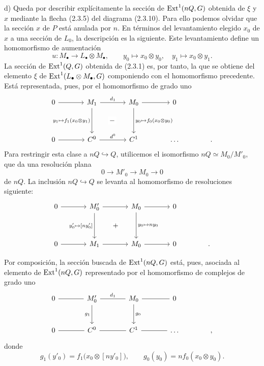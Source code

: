 \medskip
\noindent d) Queda por describir explícitamente la sección de
$\operatorname{Ext}^1(nQ,G)$ obtenida de $\xi$ y $x$ mediante la flecha (2.3.5)
del diagrama (2.3.10). Para ello podemos olvidar que la sección $x$ de
$P$ está anulada por $n$. En términos del levantamiento elegido $x_0$
de $x$ a una sección de $L_0$, la descripción es la siguiente. Este
levantamiento define un homomorfismo de aumentación
\[
 u:M_\bullet\longrightarrow L_\bullet\otimes M_\bullet,
 \qquad
 y_0\longmapsto x_0\otimes y_0,
 \quad
 y_1\longmapsto x_0\otimes y_1.
\]
La sección de $\operatorname{Ext}^1(Q,G)$ obtenida de (2.3.1) es, por tanto, la que
se obtiene del elemento $\xi$ de
$\operatorname{Ext}^1(L_\bullet\otimes M_\bullet,G)$ componiendo con el
homomorfismo precedente. Está representada, pues, por el homomorfismo
de grado uno
\[
\begin{tikzcd}[column sep=large,row sep=huge]
 0\arrow[r]&M_1\arrow[r,"d_1"]
   \arrow[d,"{y_1\mapsto f_1(x_0\otimes y_1)}"']
   \arrow[rd,phantom,"-" description]
   &M_0\arrow[r]
   \arrow[d,"{y_0\mapsto f_{\sisi{1}{0}}(x_0\otimes y_0)}"]&0\\
 0\arrow[r]&C^0\arrow[r,"d^0"]&C^1&\ldots&{.}
\end{tikzcd}
\]
Para restringir esta clase a $nQ\hookrightarrow Q$, utilicemos el
isomorfismo $nQ\simeq M_0/M'_0$, que da una resolución plana
\[
 0\longrightarrow M'_0\longrightarrow M_0\longrightarrow0
\]
de $nQ$. La inclusión $nQ\hookrightarrow Q$ se levanta al
homomorfismo de resoluciones siguiente:
\[
\begin{tikzcd}[column sep=large,row sep=huge]
 0\arrow[r]&M'_0\arrow[r]
   \arrow[d,"{y'_0\mapsto[ny'_0]}"']
   \arrow[rd,phantom,"+" description]
   &M_0\arrow[r]\arrow[d,"{y_0\mapsto ny_0}"]&0\\
 0\arrow[r]&M_1\arrow[r]&M_0\arrow[r]&0&{.}
\end{tikzcd}
\]


Por composición, la sección buscada de $\operatorname{Ext}^1(nQ,G)$ está, pues,
asociada al elemento de $\operatorname{Ext}^1(nQ,G)$ representado por el
homomorfismo de complejos de grado uno
\[
\begin{tikzcd}[column sep=large,row sep=large]
 0\arrow[r,dash]&M'_0\arrow[r,dash,"d_1"]\arrow[d,"g_1"']
   &M_0\arrow[r,dash]\arrow[d,"g_0"]&0&{}\\
 0\arrow[r,dash]&C^0\arrow[r,dash]&C^1\arrow[r,dash]&\dots&{,}
\end{tikzcd}
\]
donde
\[
 g_1(y'_0)=f_1\bigl(x_0\otimes[ny'_0]\bigr),
 \qquad
 g_0(y_0)=n f_0(x_0\otimes y_0).
\]

